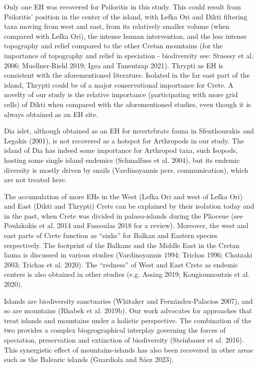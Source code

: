 Only one EH was recovered for Psiloritis in this study. This could result from
Psiloritis’ position in the center of the island, with Lefka Ori and Dikti
filtering taxa moving from west and east, from its relatively smaller volume
(when compared with Lefka Ori), the intense human intervention, and the less
intense topography and relief compared to the other Cretan mountains (for the
importance of topography and relief in speciation - biodiversity see: Stuessy et al. 2006; Muellner-Riehl 2019; Igea and Tanentzap 2021).
Thrypti as EH is consistent with the aforementioned literature. Isolated in the
far east part of the island, Thrypti could be of a major conservational importance for Crete.
A novelty of our study is the relative importance (participating with more grid cells)
of Dikti when compared with the aforementioned studies, even though it is always obtained as an EH site. 

Dia islet, although obtained as an EH for invertebrate fauna in Sfenthourakis
and Legakis (2001), is not recovered as a hotspot for Arthropods in our study.
The island of Dia has indeed some importance for Arthropod taxa, such Isopods,
hosting some single island endemics (Schmalfuss et al. 2004), but its endemic
diversity is mostly driven by snails (Vardinoyannis pers. communication), which
are not treated here.

The accumulation of more EHs in the West (Lefka Ori and west of Lefka Ori) and
East (Dikti and Thrypti) Crete can be explained by their isolation today and in
the past, when Crete was divided in palaeo-islands during the Pliocene
(see Poulakakis et al. 2014 and Fassoulas 2018 for a review). Moreover, the
west and east parts of Crete function as “sinks'' for Balkan and Eastern
species respectively. The footprint of the Balkans and the Middle East in the
Cretan fauna is discussed in various studies (Vardinoyannis 1994; Trichas 1996; Chatzaki 2003; Trichas et al. 2020).
The “redness” of West and East Crete as endemic centers is also obtained in
other studies (e.g. Assing 2019; Kougioumoutzis et al. 2020). 

Islands are biodiversity sanctuaries (Whitaker and Fernández-Palacios 2007), and
so are mountains (Rhabek et al. 2019b). Our work advocates for approaches that
treat islands and mountains under a holistic perspective. The combination of
the two provides a complex biogeographical interplay governing the forces of
speciation, preservation and extinction of biodiversity (Steinbauer et al. 2016).
This synergistic effect of mountains-islands has also been recovered in other
areas such as the Balearic islands (Guardiola and Sáez 2023).

